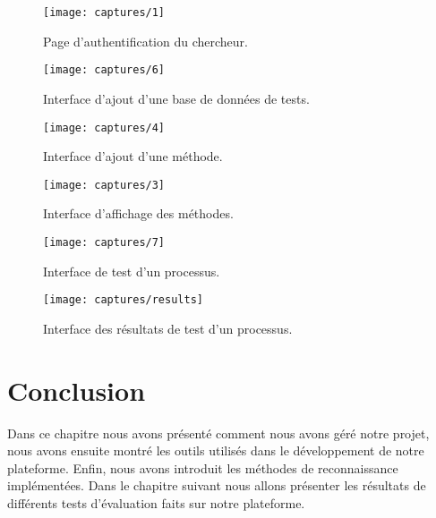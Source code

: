 \begin{figure}[H]
	\centering
	\texttt{[image: captures/1]}
	\caption{Page d’authentification du chercheur.}
	\label{}
\end{figure}
\begin{figure}[H]
	\centering
	\texttt{[image: captures/6]}
	\caption{Interface d'ajout d'une base de données de tests.}
	\label{}
\end{figure}
\begin{figure}[H]
	\centering
	\texttt{[image: captures/4]}
	\caption{Interface d'ajout d'une méthode.}
	\label{}
\end{figure}
\begin{figure}[H]
	\centering
	\texttt{[image: captures/3]}
	\caption{Interface d'affichage des méthodes.}
	\label{}
\end{figure}

\begin{figure}[H]
	\centering
	\texttt{[image: captures/7]}
	\caption{Interface de test d'un processus.}
	\label{}
\end{figure}
\begin{figure}[H]
	\centering
	\texttt{[image: captures/results]}
	\caption{Interface des résultats de test d'un processus.}
	\label{}
\end{figure}

\section{Conclusion}
Dans ce chapitre nous avons présenté comment nous avons géré notre projet, nous avons ensuite montré les outils utilisés dans le développement de notre plateforme. Enfin, nous avons introduit les méthodes de reconnaissance implémentées. Dans le chapitre suivant nous allons présenter les résultats de différents tests d'évaluation faits sur notre plateforme.
